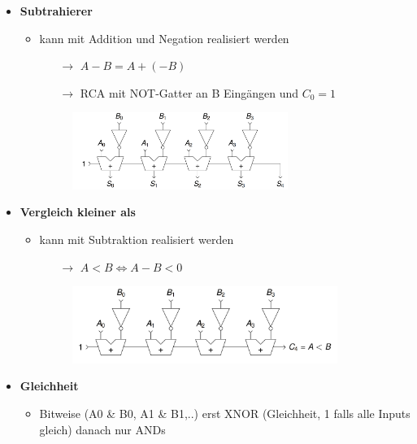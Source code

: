 \documentclass[11pt,a4paper]{article}
\begin{document}
\begin{itemize}
\item \textbf{Subtrahierer}
	\begin{itemize}
	\item kann mit Addition und Negation realisiert werden
		\begin{itemize}
		\item[$\rightarrow$] $A-B = A+ (-B)$
		\item[$\rightarrow$] RCA mit NOT-Gatter an B Eingängen und $C_0 = 1$
		\end{itemize}
	\item[]
		\begin{figure}[H]
		\begin{center}
		\includegraphics[height=2.5cm]{Bilder/subtrahierer}
		\end{center}
		\end{figure}
	\end{itemize}
	
\item \textbf{Vergleich kleiner als}
	\begin{itemize}
	\item kann mit Subtraktion realisiert werden
		\begin{itemize}
		\item[$\rightarrow$] $A < B \Leftrightarrow A-B <0$
		\end{itemize}
	\item[]
		\begin{figure}[H]
		\begin{center}
		\includegraphics[height=2.5cm]{Bilder/kleinerals}
		\end{center}
		\end{figure}
	\end{itemize}

\item \textbf{Gleichheit}
	\begin{itemize}
	\item Bitweise (A0 \& B0, A1 \& B1,..) erst XNOR (Gleichheit, 1 falls alle Inputs gleich) danach nur ANDs
	\end{itemize}


\end{itemize}
\end{document}
